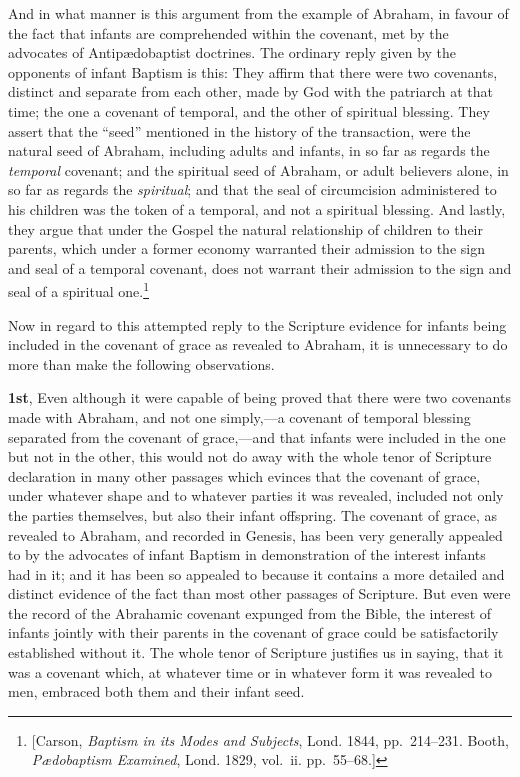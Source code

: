 \documentclass[
  english,
]{book}
\begin{document}
And in what manner is this argument from the example of Abraham, in favour of the fact that infants are comprehended within the covenant, met by the advocates of Antipædobaptist doctrines. The ordinary reply given by the opponents of infant Baptism is this: They affirm that there were two covenants, distinct and separate from each other, made by God with the patriarch at that time; the one a covenant of temporal, and the other of spiritual blessing. They assert that the ``seed'' mentioned in the history of the transaction, were the natural seed of Abraham, including adults and infants, in so far as regards the \emph{temporal} covenant; and the spiritual seed of Abraham, or adult believers alone, in so far as regards the \emph{spiritual}; and that the seal of circumcision administered to his children was the token of a temporal, and not a spiritual blessing. And lastly, they argue that under the Gospel the natural relationship of children to their parents, which under a former economy warranted their admission to the sign and seal of a temporal covenant, does not warrant their admission to the sign and seal of a spiritual one.\footnote{{[}Carson, \emph{Baptism in its Modes and Subjects}, Lond. 1844, pp.~214--231. Booth, \emph{Pædobaptism Examined}, Lond. 1829, vol.~ii. pp.~55--68.{]}}

Now in regard to this attempted reply to the Scripture evidence for infants being included in the covenant of grace as revealed to Abraham, it is unnecessary to do more than make the following observations.

\textbf{1st}, Even although it were capable of being proved that there were two covenants made with Abraham, and not one simply,---a covenant of temporal blessing separated from the covenant of grace,---and that infants were included in the one but not in the other, this would not do away with the whole tenor of Scripture declaration in many other passages which evinces that the covenant of grace, under whatever shape and to whatever parties it was revealed, included not only the parties themselves, but also their infant offspring. The covenant of grace, as revealed to Abraham, and recorded in Genesis, has been very generally appealed to by the advocates of infant Baptism in demonstration of the interest infants had in it; and it has been so appealed to because it contains a more detailed and distinct evidence of the fact than most other passages of Scripture. But even were the record of the Abrahamic covenant expunged from the Bible, the interest of infants jointly with their parents in the covenant of grace could be satisfactorily established without it. The whole tenor of Scripture justifies us in saying, that it was a covenant which, at whatever time or in whatever form it was revealed to men, embraced both them and their infant seed.
\end{document}

